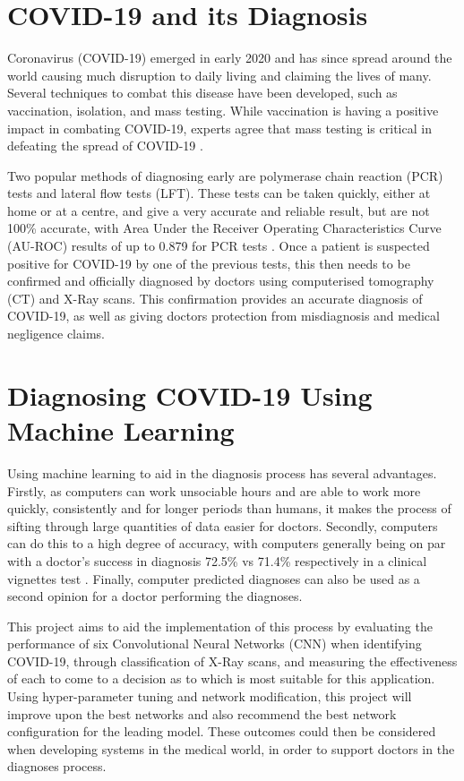 \section{COVID-19 and its Diagnosis}
Coronavirus (COVID-19) emerged in early 2020 and has since spread around the world causing much disruption to daily living and claiming the lives of many. Several techniques to combat this disease have been developed, such as vaccination, isolation, and mass testing. While vaccination is having a positive impact in combating COVID-19, experts agree that mass testing is critical in defeating the spread of COVID-19 \citep{rosenthal2020importance}.

Two popular methods of diagnosing early are polymerase chain reaction (PCR) tests and lateral flow tests (LFT). These tests can be taken quickly, either at home or at a centre, and give a very accurate and reliable result, but are not 100\% accurate, with Area Under the Receiver Operating Characteristics Curve (AU-ROC) results of up to 0.879 for PCR tests \citep{mardani2020laboratory}. Once a patient is suspected positive for COVID-19 by one of the previous tests, this then needs to be confirmed and officially diagnosed by doctors using computerised tomography (CT) and X-Ray scans. This confirmation provides an accurate diagnosis of COVID-19, as well as giving doctors protection from misdiagnosis and medical negligence claims.

\section{Diagnosing COVID-19 Using Machine Learning}
Using machine learning to aid in the diagnosis process has several advantages. Firstly, as computers can work unsociable hours and are able to work more quickly, consistently and for longer periods than humans, it makes the process of sifting through large quantities of data easier for doctors. Secondly, computers can do this to a high degree of accuracy, with computers generally being on par with a doctor’s success in diagnosis 72.5\% vs 71.4\% respectively in a clinical vignettes test \citep{richens2020improving}. Finally, computer predicted diagnoses can also be used as a second opinion for a doctor performing the diagnoses. 

This project aims to aid the implementation of this process by evaluating the performance of six Convolutional Neural Networks (CNN) when identifying COVID-19, through classification of X-Ray scans, and measuring the effectiveness of each to come to a decision as to which is most suitable for this application. Using hyper-parameter tuning and network modification, this project will improve upon the best networks and also recommend the best network configuration for the leading model. These outcomes could then be considered when developing systems in the medical world, in order to support doctors in the diagnoses process.